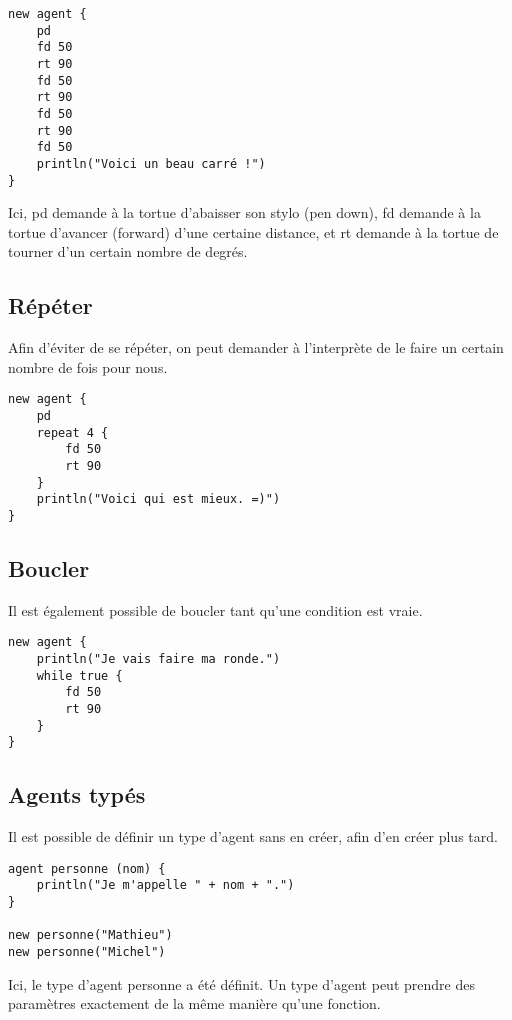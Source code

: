 \begin{lstlisting}[language=Stibbons]
new agent {
    pd
    fd 50
    rt 90
    fd 50
    rt 90
    fd 50
    rt 90
    fd 50
    println("Voici un beau carré !")
}
\end{lstlisting}

Ici, pd demande à la tortue d'abaisser son stylo (pen down), fd demande à la tortue d'avancer (forward) d'une certaine distance, et rt demande à la tortue de tourner d'un certain nombre de degrés.

\subsection{Répéter}

Afin d'éviter de se répéter, on peut demander à l'interprète de le faire un certain nombre de fois pour nous.

\begin{lstlisting}[language=Stibbons]
new agent {
    pd
    repeat 4 {
        fd 50
        rt 90
    }
    println("Voici qui est mieux. =)")
}
\end{lstlisting}

\subsection{Boucler}

Il est également possible de boucler tant qu'une condition est vraie.

\begin{lstlisting}[language=Stibbons]
new agent {
    println("Je vais faire ma ronde.")
    while true {
        fd 50
        rt 90
    }
}
\end{lstlisting}

\subsection{Agents typés}

Il est possible de définir un type d'agent sans en créer, afin d'en créer plus tard.

\begin{lstlisting}[language=Stibbons]
agent personne (nom) {
    println("Je m'appelle " + nom + ".")
}

new personne("Mathieu")
new personne("Michel")
\end{lstlisting}

Ici, le type d'agent personne a été définit. Un type d'agent peut prendre des paramètres exactement de la même manière qu'une fonction.

